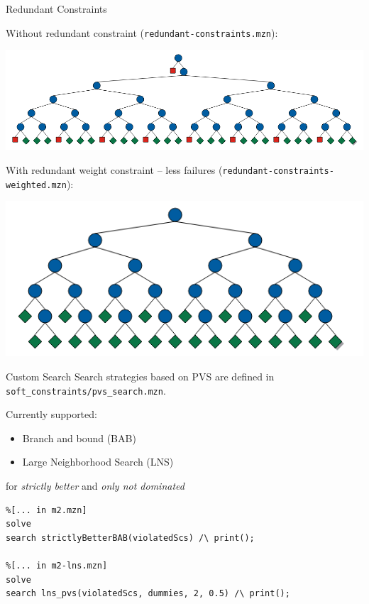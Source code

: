 \documentclass[10pt,xcolor={dvipsnames},fleqn]{beamer}
\begin{document}
\begin{frame}{Redundant Constraints}

\begin{center}
Without redundant constraint (\texttt{redundant-constraints.mzn}):

\includegraphics[width=.6\textwidth]{img/withoutred.png}

\vspace*{3ex}

With redundant weight constraint -- less failures (\texttt{redundant-constraints-weighted.mzn}):

\includegraphics[width=.4\textwidth]{img/withred.png}
\end{center}
\end{frame}

\begin{frame}[fragile]{Custom Search}
Search strategies based on PVS are defined in \texttt{soft\_constraints/pvs\_search.mzn}.

\vspace*{2ex}

Currently supported:
\begin{itemize}
\item Branch and bound (BAB)
\item Large Neighborhood Search (LNS)
\end{itemize}

\vspace*{2ex}

for \emph{strictly better} and \emph{only not dominated}

\begin{lstlisting}
%[... in m2.mzn]
solve
search strictlyBetterBAB(violatedScs) /\ print();

%[... in m2-lns.mzn]
solve 
search lns_pvs(violatedScs, dummies, 2, 0.5) /\ print();
\end{lstlisting}

\end{frame}
\end{document}
